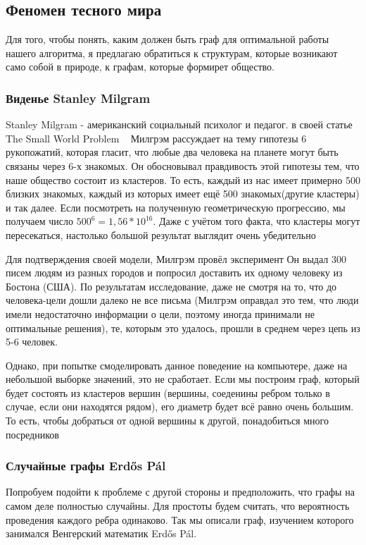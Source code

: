 \subsection{Феномен тесного мира}

Для того, чтобы понять, каким должен быть граф для 
оптимальной работы нашего алгоритма, я предлагаю обратиться
к структурам, которые возникают само собой в приро\-де, 
к графам, которые формирет общество.

\subsubsection{Виденье Stanley Milgram}
Stanley Milgram - американский социальный психолог и педагог.
в своей статье The Small World Problem ~\cite{TheSmallWorldProblem}
Милгрэм рассуждает на тему гипотезы 6 рукопожатий, которая гласит, что 
любые два человека на планете могут быть связаны через 6-х
знакомых. Он обосновывал правдивость этой гипотезы тем, что наше
общество состоит из кластеров. То есть, каждый из нас имеет примерно 500
близких знакомых, каждый из которых имеет ещё 500 знакомых(другие кластеры)
и так далее. Если посмотреть на полученную геометрическую прогрессию, мы
получаем число $ 500^6 = 1,56 * 10^{16} $. Даже с учётом того факта, что
кластеры могут пересекаться, настолько большой результат выглядит 
очень убедительно

Для подтверждения своей модели, Милгрэм провёл эксперимент
Он выдал 300 писем людям из разных городов и попросил доставить 
их одному человеку из Бостона (США). 
По результатам исследование, даже не смотря на то, что до человека-цели
дошли далеко не все письма (Милгрэм оправдал это тем, что люди имели
недостаточно информации о цели, поэтому иногда принимали не оптимальные
решения), те, которым это удалось, прошли в среднем через цепь из
5-6 человек. 

Однако, при попытке смоделировать данное поведение на компьютере, даже
на небольшой выборке значений, это не сработает. Если мы построим
граф, который будет состоять из кластеров вершин (вершины, соеденины
ребром только в случае, если они находятся рядом), его диаметр будет
всё равно очень большим. То есть, чтобы добраться от одной вершины
к другой, понадобиться много посредников

\subsubsection{Случайные графы Erdős Pál}
Попробуем подойти к проблеме с другой стороны и предположить, что
графы на самом деле полностью случайны. Для простоты будем считать,
что вероятность проведения каждого ребра одинаково. Так мы описали граф, изучением которого занимался
Венгерский математик Erdős Pál. 

